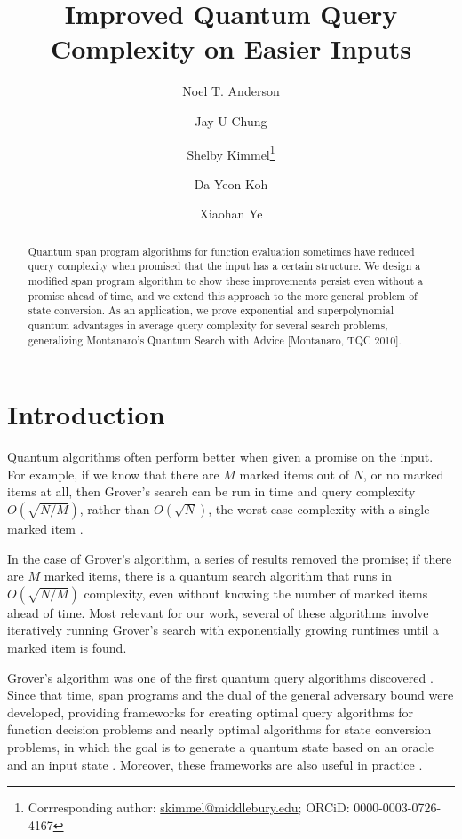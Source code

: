\documentclass[cleveref, autoref, thm-restate,11pt]{article}
\title{Improved Quantum Query Complexity on Easier Inputs}
\author[1]{Noel T. Anderson}
\affil[1]{Middlebury College, Middlebury, VT, USA}
\author[1]{Jay-U Chung}
\author[1]{Shelby Kimmel\footnote{Corrresponding author: \href{mailto:skimmel@middlebury.edu}{skimmel@middlebury.edu}; ORCiD: 0000-0003-0726-4167}}
\author[2]{Da-Yeon Koh}
\affil[2]{Williams College, Williamstown, MA, USA}
\author[1,3]{Xiaohan Ye}
\affil[3]{Brown University, Providence, RI, USA}
\date{}
\theoremstyle{definition}
\providecommand{\ack}[1]
{
  \small  
  \textbf{\textit{Acknolwedgments---}} #1
}
\begin{document}
\maketitle

\vspace{-.5cm}
\begin{abstract} 
Quantum span program algorithms for function evaluation sometimes have reduced query complexity when promised that the input has a certain structure. We design a modified span program algorithm to show these improvements persist even without a promise ahead of time, and we extend this approach to the more general problem of state conversion.  As an application, we prove exponential and superpolynomial quantum advantages in average query complexity for several search problems, generalizing Montanaro's Quantum Search with Advice [Montanaro, TQC 2010]. 
\end{abstract}


\section{Introduction}\label{sec:intro} 

Quantum algorithms often perform
 better when given a promise on the input. For example, if we know that there
 are $M$ marked items out of $N$, or no marked items at all, then Grover's
 search can be run in time and query complexity $O(\sqrt{N/M})$, rather than
 $O(\sqrt{N})$, the worst case complexity with a single marked item \cite
 {groverQuantumMechanicsHelps1997a,aharonovQuantumComputation1999}.


In the case of Grover's algorithm, a series of results
\cite{boyerTightBoundsQuantum1998,brassardQuantumAmplitudeAmplification2000,brassardQuantumCounting1998}
removed the promise; if there are $M$ marked items, there is a quantum
search algorithm that runs in $O(\sqrt{N/M})$ complexity, even without
knowing the number of marked items ahead of time. Most relevant for our
work, several of these algorithms involve iteratively running Grover's
search with exponentially growing runtimes \cite
{boyerTightBoundsQuantum1998,brassardQuantumAmplitudeAmplification2000}
until a marked item is found.

Grover's algorithm was one of the first quantum query algorithms
discovered \cite{groverQuantumMechanicsHelps1997a}. Since that time, span
programs and the dual of the general adversary bound were developed,
providing frameworks for creating optimal query algorithms for function
decision problems
\cite{reichardtSpanProgramsQuantum2009,reichardtReflectionsQuantumQuery2011}
and nearly optimal algorithms for state conversion problems, in which the goal is to generate a quantum state based on an oracle and an input state \cite{leeQuantumQueryComplexity2011}. 
Moreover, these frameworks are also useful in practice \cite{beigiQuantumSpeedupBased2019,belovsSpanProgramsQuantum2012,belovsSpanProgramsFunctions2012,belovsTightQuantumLower2020a,cadeTimeSpaceEfficient2018,delorenzoApplicationsQuantumAlgorithm2019a}.
\end{document}
